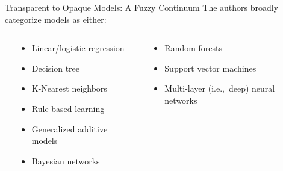 \documentclass[11pt,dvipsnames,usenames,aspectratio=169]{beamer}  %
\begin{document}
\begin{frame}{Transparent to Opaque Models: A Fuzzy Continuum}{}
  The authors broadly categorize models as either:
   \begin{columns}
     \begin{column}{0.025\textwidth}
     \end{column}
     \begin{column}{0.40\textwidth}
       \begin{center}
         \textbf{\large {}}
         \begin{itemize}
           \item Linear/logistic regression
           \item Decision tree
           \item K-Nearest neighbors
           \item Rule-based learning
           \item Generalized additive models
           \item Bayesian networks
         \end{itemize}
       \end{center}
     \end{column}
     \begin{column}{0.05\textwidth}
     \end{column}
     \begin{column}{0.40\textwidth}
       \begin{center}
         \textbf{\large {}}
         \begin{itemize}
           \item Random forests
           \item Support vector machines
           \item Multi-layer (i.e.,~deep) neural networks
         \end{itemize}
       \end{center}
     \end{column}
     \begin{column}{0.025\textwidth}
     \end{column}
   \end{columns}

   \vspace{16pt}
\end{frame}
\end{document}
